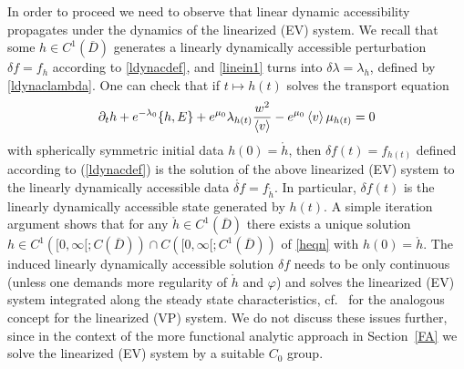\documentclass[11pt]{article}
\begin{document}
In order to proceed we need to observe that linear dynamic accessibility
propagates under the dynamics of the linearized (EV) system.
We recall that some $h\in C^1(\overline{D})$ generates a
linearly dynamically accessible perturbation $\delta f = f_h$ according
to \eqref{ldynacdef}, and \eqref{linein1} turns into
$\delta \lambda = \lambda_h$, defined by \eqref{ldynaclambda}.
One can check that if $t\mapsto h(t)$ solves the
transport equation
\begin{equation}\label{heqn}
  \partial_t h + e^{-\lambda_0}\{h,E\} +
  e^{\mu_0} \lambda_{h(t)}  \frac{w^2}{\left\langle v\right\rangle } -
  e^{\mu_0} \left\langle v\right\rangle \mu_{h(t)} =0
\end{equation}
with spherically symmetric initial data $h(0)=\mathring{h}$,
then $\delta f (t) = f_{h(t)}$ defined according to (\ref{ldynacdef})
is the solution of the above
linearized (EV) system
to the linearly dynamically accessible data
$\mathring{\delta f}=f_{\mathring{h}}$. In particular,
$\delta f(t)$ is the linearly dynamically accessible state generated
by $h(t)$.
A simple iteration argument shows that for any
$\mathring{h} \in C^1(\overline{D})$
there exists a unique solution
$h\in C^1([0,\infty[;C(\overline{D}))
 \cap C ([0,\infty[;C^1(\overline{D}))$
of \eqref{heqn} with $h(0)=\mathring{h}$.
The induced linearly dynamically accessible solution
$\delta f$ needs to be only continuous
(unless one demands more regularity of $\mathring{h}$ and $\varphi$)
and solves the linearized (EV) system integrated along the steady
state characteristics, cf.~\cite{BaMoRe95} for the analogous concept for
the linearized (VP) system. We do not discuss these issues further, since in
the context of the more functional analytic approach in Section~\ref{FA}
we solve the linearized (EV) system by a suitable $C_0$ group. 
\end{document}
